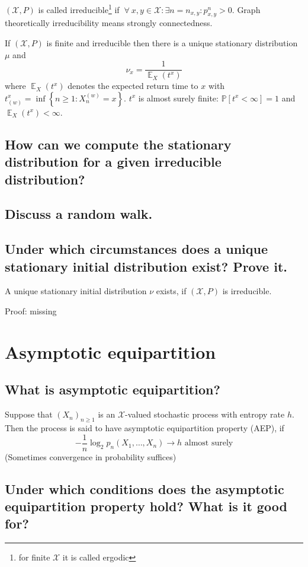 \documentclass[a4paper]{article}
\newcommand\os[2][P]{\mathbb{#1}\left[#2\right]}
\newcommand\fall{\:\forall\:}
\newcommand\set[1]{\left\{#1\right\}}
\newcommand\converges{\rightarrow}
\DeclareMathOperator{\Ex}{\mathbb{E}}
\theoremstyle{definition}
\begin{document}
$(\mathcal{X}, P)$ is called irreducible\footnote{for finite $\mathcal{X}$ it is called ergodic} if $\fall x,y \in \mathcal{X}: \exists n = n_{x,y}: p_{x,y}^n > 0$. Graph theoretically irreducibility means strongly connectedness.

If $(\mathcal{X}, P)$ is finite and irreducible then there is a unique stationary distribution $\mu$ and
\[
  \nu_x = \frac{1}{\Ex_X(t^x)}
\]
where $\Ex_X(t^x)$ denotes the expected return time to $x$ with $t_{(w)}^x = \inf\set{n \geq 1: X_n^{(w)} = x}$.
$t^x$ is almost surely finite: $\os{t^x < \infty} = 1$ and $\Ex_X(t^x) < \infty$.

\subsection{How can we compute the stationary distribution for a given irreducible distribution?}

\subsection{Discuss a random walk.}

\subsection{Under which circumstances does a unique stationary initial distribution exist? Prove it.}

A unique stationary initial distribution $\nu$ exists, if $(\mathcal{X}, P)$ is irreducible.

Proof: missing

\section{Asymptotic equipartition}

\subsection{What is asymptotic equipartition?}

Suppose that $(X_n)_{n \geq 1}$ is an $\mathcal{X}$-valued stochastic process with entropy rate $h$. Then the process is said to have asymptotic equipartition property (AEP), if
\[ -\frac1n \log_2 p_n(X_1, \dotsc, X_n) \converges h \text{ almost surely} \]
(Sometimes convergence in probability suffices)

\subsection{Under which conditions does the asymptotic equipartition property hold? What is it good for?}
\end{document}
